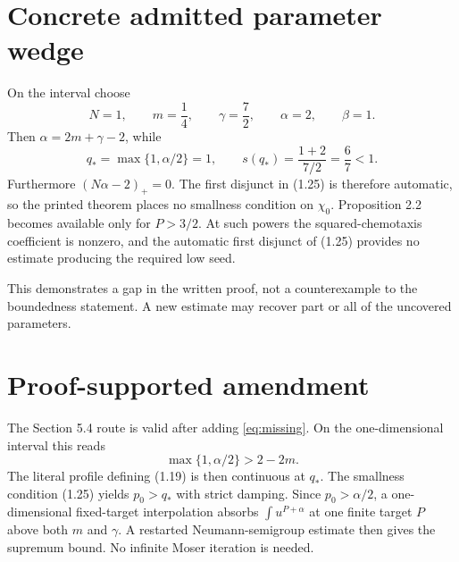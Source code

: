 \documentclass[11pt]{article}
\newcommand{\pos}[1]{\left(#1\right)_{+}}
\begin{document}
\section{Concrete admitted parameter wedge}

On the interval choose
\begin{equation}
  N=1,\qquad m=\frac14,\qquad \gamma=\frac72,\qquad
  \alpha=2,\qquad \beta=1.
\end{equation}
Then \(\alpha=2m+\gamma-2\), while
\begin{equation}
  q_*=\max\{1,\alpha/2\}=1,
  \qquad
  s(q_*)=\frac{1+2}{7/2}=\frac67<1.
\end{equation}
Furthermore \(\pos{N\alpha-2}=0\).  The first disjunct in (1.25) is
therefore automatic, so the printed theorem places no smallness condition on
\(\chi_0\).  Proposition 2.2 becomes available only for \(P>3/2\).  At such
powers the squared-chemotaxis coefficient is nonzero, and the automatic first
disjunct of (1.25) provides no estimate producing the required low seed.

This demonstrates a gap in the written proof, not a counterexample to the
boundedness statement.  A new estimate may recover part or all of the
uncovered parameters.

\section{Proof-supported amendment}

The Section 5.4 route is valid after adding \eqref{eq:missing}.  On the
one-dimensional interval this reads
\begin{equation}
  \max\{1,\alpha/2\}>2-2m.
\end{equation}
The literal profile defining (1.19) is then continuous at \(q_*\).  The
smallness condition (1.25) yields \(p_0>q_*\) with strict damping.  Since
\(p_0>\alpha/2\), a one-dimensional fixed-target interpolation absorbs
\(\int u^{P+\alpha}\) at one finite target \(P\) above both \(m\) and
\(\gamma\).  A restarted Neumann-semigroup estimate then gives the supremum
bound.  No infinite Moser iteration is needed.

\medskip
\noindent
{}
\end{document}
